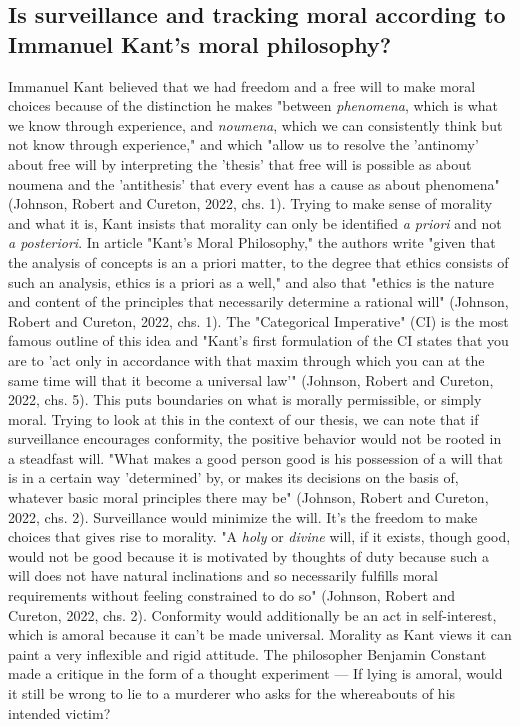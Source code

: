 \documentclass[11pt]{article}
\begin{document}
\subsection{Is surveillance and tracking moral according to Immanuel Kant's moral philosophy?}
Immanuel Kant believed that we had freedom and a free will to make moral choices because of the distinction he makes "between \textit{phenomena}, which is what we know through experience, and \textit{noumena}, which we can consistently think but not know through experience," and which "allow us to resolve the 'antinomy' about free will by interpreting the 'thesis' that free will is possible as about noumena and the 'antithesis' that every event has a cause as about phenomena" (Johnson, Robert and Cureton, 2022, chs. 1). Trying to make sense of morality and what it is, Kant insists that morality can only be identified \textit{a priori} and not \textit{a posteriori}. In article "Kant’s Moral Philosophy," the authors write "given that the analysis of concepts is an a priori matter, to the degree that ethics consists of such an analysis, ethics is a priori as a well," and also that "ethics is the nature and content of the principles that necessarily determine a rational will" (Johnson, Robert and Cureton, 2022, chs. 1). The "Categorical Imperative" (CI) is the most famous outline of this idea and "Kant’s first formulation of the CI states that you are to 'act only in accordance with that maxim through which you can at the same time will that it become a universal law'" (Johnson, Robert and Cureton, 2022, chs. 5). This puts boundaries on what is morally permissible, or simply moral. Trying to look at this in the context of our thesis, we can note that if surveillance encourages conformity, the positive behavior would not be rooted in a steadfast will. "What makes a good person good is his possession of a will that is in a certain way 'determined' by, or makes its decisions on the basis of, whatever basic moral principles there may be" (Johnson, Robert and Cureton, 2022, chs. 2). Surveillance would minimize the will. It's the freedom to make choices that gives rise to morality. "A \textit{holy} or \textit{divine} will, if it exists, though good, would not be good because it is motivated by thoughts of duty because such a will does not have natural inclinations and so necessarily fulfills moral requirements without feeling constrained to do so" (Johnson, Robert and Cureton, 2022, chs. 2). Conformity would additionally be an act in self-interest, which is amoral because it can't be made universal. Morality as Kant views it can paint a very inflexible and rigid attitude. The philosopher Benjamin Constant made a critique in the form of a thought experiment --- If lying is amoral, would it still be wrong to lie to a murderer who asks for the whereabouts of his intended victim? 
\\ \\
\end{document}
